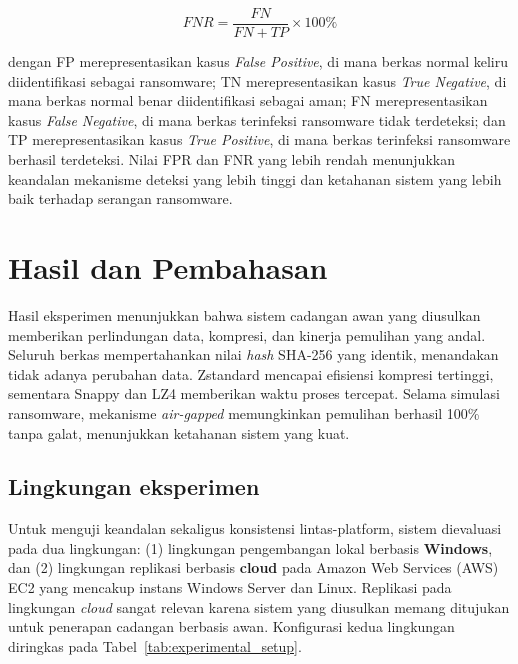 \documentclass{iaesarticle}
\begin{document}
\begin{equation}
FNR = \frac{FN}{FN + TP} \times 100\%
\end{equation}

dengan FP merepresentasikan kasus \textit{False Positive}, di mana berkas normal keliru diidentifikasi sebagai ransomware; TN merepresentasikan kasus \textit{True Negative}, di mana berkas normal benar diidentifikasi sebagai aman; FN merepresentasikan kasus \textit{False Negative}, di mana berkas terinfeksi ransomware tidak terdeteksi; dan TP merepresentasikan kasus \textit{True Positive}, di mana berkas terinfeksi ransomware berhasil terdeteksi. Nilai FPR dan FNR yang lebih rendah menunjukkan keandalan mekanisme deteksi yang lebih tinggi dan ketahanan sistem yang lebih baik terhadap serangan ransomware.

\section{Hasil dan Pembahasan}
\label{sec:hasil}
Hasil eksperimen menunjukkan bahwa sistem cadangan awan yang diusulkan memberikan perlindungan data, kompresi, dan kinerja pemulihan yang andal. Seluruh berkas mempertahankan nilai \textit{hash} SHA-256 yang identik, menandakan tidak adanya perubahan data. Zstandard mencapai efisiensi kompresi tertinggi, sementara Snappy dan LZ4 memberikan waktu proses tercepat. Selama simulasi ransomware, mekanisme \textit{air-gapped} memungkinkan pemulihan berhasil 100\% tanpa galat, menunjukkan ketahanan sistem yang kuat.

\subsection{Lingkungan eksperimen}
Untuk menguji keandalan sekaligus konsistensi lintas-platform, sistem dievaluasi pada dua lingkungan: (1) lingkungan pengembangan lokal berbasis \textbf{Windows}, dan (2) lingkungan replikasi berbasis \textbf{cloud} pada Amazon Web Services (AWS) EC2 yang mencakup instans Windows Server dan Linux. Replikasi pada lingkungan \textit{cloud} sangat relevan karena sistem yang diusulkan memang ditujukan untuk penerapan cadangan berbasis awan. Konfigurasi kedua lingkungan diringkas pada Tabel~\ref{tab:experimental_setup}.
\end{document}
